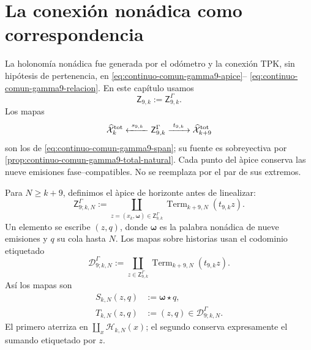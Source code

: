 \section{La conexión nonádica como correspondencia}

La holonom\'ia non\'adica fue generada por el od\'ometro y la conexi\'on TPK,
sin hip\'otesis de pertenencia, en
\eqref{eq:continuo-comun-gamma9-apice}--
\eqref{eq:continuo-comun-gamma9-relacion}. En este cap\'itulo usamos
\begin{equation}
\label{eq:pdfv2-terminal-apice-gamma9}
 \mathsf Z_{9,k}:=\mathsf Z^{\Gamma}_{9,k}.
\end{equation}
Los mapas
\begin{equation}
\label{eq:pdfv2-terminal-span-gamma9}
 \widehat{\mathcal X}^{\rm tot}_k
 \xleftarrow{\ s_{9,k}\ }
 \mathsf Z^{\Gamma}_{9,k}
 \xrightarrow{\ t_{9,k}\ }
 \widehat{\mathcal X}^{\rm tot}_{k+9}
\end{equation}
son los de \eqref{eq:continuo-comun-gamma9-span}; su fuente es sobreyectiva
por \cref{prop:continuo-comun-gamma9-total-natural}. Cada punto del \`apice
conserva las nueve emisiones fase--compatibles. No se reemplaza por el par
de sus extremos.

Para \(N\geq k+9\), definimos el \`apice de horizonte antes de linealizar:
\begin{equation}
\label{eq:pdfv2-terminal-apice-horizonte-gamma9}
 \mathsf Z^\Gamma_{9;k,N}:=
 \coprod_{z=(\widehat x_k,\boldsymbol\omega)
            \in\mathsf Z^\Gamma_{9,k}}
 \operatorname{Term}_{k+9,N}(t_{9,k}z).
\end{equation}
Un elemento se escribe \((z,q)\), donde \(\boldsymbol\omega\) es la palabra
non\'adica de nueve emisiones y \(q\) su cola hasta \(N\). Los mapas sobre
historias usan el codominio etiquetado
\begin{equation}
\label{eq:pdfv2-terminal-gamma9-codominio-colas}
 \mathscr D^\Gamma_{9;k,N}:=
 \coprod_{z\in\mathsf Z^\Gamma_{9,k}}
 \operatorname{Term}_{k+9,N}(t_{9,k}z).
\end{equation}
Así los mapas son
\begin{align}
 S_{k,N}(z,q)&:=\boldsymbol\omega\star q,
 \label{eq:pdfv2-terminal-gamma9-s-horizonte}\\
 T_{k,N}(z,q)&:=(z,q)\in\mathscr D^\Gamma_{9;k,N}.
 \label{eq:pdfv2-terminal-gamma9-t-horizonte}
\end{align}
El primero aterriza en
\(\coprod_x\mathscr H_{k,N}(x)\); el segundo conserva expresamente el
sumando etiquetado por \(z\).

